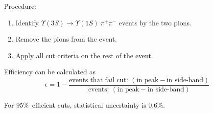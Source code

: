 \begin{slide*}
\slideframe{}
\begin{minipage}[t]{\linewidth}
\Large

\vspace{0.25cm}

Procedure:
\begin{enumerate}

  \item Identify $\Upsilon(3S) \to \Upsilon(1S)\  \pi^+ \pi^-$ events by the two pions.

  \item Remove the pions from the event.

  \item Apply all cut criteria on the rest of the event.

\end{enumerate}

\vspace{0.5cm}

\begin{center}
\end{center}

\vspace{0.5cm}

Efficiency can be calculated as
\[ \epsilon = 1 - \frac{\mbox{events that fail cut: }
(\mbox{in peak} - \mbox{in side-band})}{\mbox{events: }
(\mbox{in peak} - \mbox{in side-band})} \]

\vspace{0.5cm}

For 95\%--efficient cuts, statistical uncertainty is 0.6\%.

\end{minipage}
\end{slide*}






